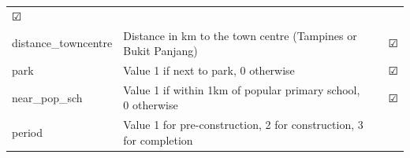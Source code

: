\documentclass[]{book}
\begin{document}
\begin{longtable}[]{@{}llll@{}}
\begin{minipage}[t]{0.05\columnwidth}
☑\strut
\end{minipage}\tabularnewline
\begin{minipage}[t]{0.09\columnwidth}\raggedright\strut
distance\_towncentre\strut
\end{minipage} & \begin{minipage}[t]{0.70\columnwidth}\raggedright\strut
Distance in km to the town centre (Tampines or Bukit Panjang)\strut
\end{minipage} & \begin{minipage}[t]{0.04\columnwidth}\raggedright\strut
\strut
\end{minipage} & \begin{minipage}[t]{0.05\columnwidth}\raggedright\strut
☑\strut
\end{minipage}\tabularnewline
\begin{minipage}[t]{0.09\columnwidth}\raggedright\strut
park\strut
\end{minipage} & \begin{minipage}[t]{0.70\columnwidth}\raggedright\strut
Value 1 if next to park, 0 otherwise\strut
\end{minipage} & \begin{minipage}[t]{0.04\columnwidth}\raggedright\strut
\strut
\end{minipage} & \begin{minipage}[t]{0.05\columnwidth}\raggedright\strut
☑\strut
\end{minipage}\tabularnewline
\begin{minipage}[t]{0.09\columnwidth}\raggedright\strut
near\_pop\_sch\strut
\end{minipage} & \begin{minipage}[t]{0.70\columnwidth}\raggedright\strut
Value 1 if within 1km of popular primary school, 0 otherwise\strut
\end{minipage} & \begin{minipage}[t]{0.04\columnwidth}\raggedright\strut
\strut
\end{minipage} & \begin{minipage}[t]{0.05\columnwidth}\raggedright\strut
☑\strut
\end{minipage}\tabularnewline
\begin{minipage}[t]{0.09\columnwidth}\raggedright\strut
period\strut
\end{minipage} & \begin{minipage}[t]{0.70\columnwidth}\raggedright\strut
Value 1 for pre-construction, 2 for construction, 3 for completion\strut
\end{minipage} & \begin{minipage}[t]{0.04\columnwidth}\raggedright\strut

\end{minipage}
\end{longtable}
\end{document}
